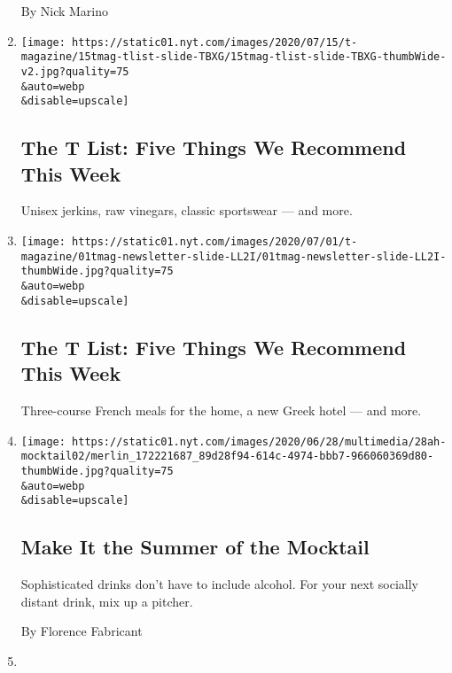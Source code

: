\begin{enumerate}
  By Nick Marino
\item
  \href{/2020/07/16/t-magazine/margo-price-album-tlist.html}{}

  \texttt{[image: https://static01.nyt.com/images/2020/07/15/t-magazine/15tmag-tlist-slide-TBXG/15tmag-tlist-slide-TBXG-thumbWide-v2.jpg?quality=75\\\&auto=webp\\\&disable=upscale]}

  \hypertarget{the-t-list-five-things-we-recommend-this-week-1}{%
  \subsection{The T List: Five Things We Recommend This
  Week}\label{the-t-list-five-things-we-recommend-this-week-1}}

  Unisex jerkins, raw vinegars, classic sportswear --- and more.
\item
  \href{/2020/07/02/t-magazine/kenzo-vans-tlist.html}{}

  \texttt{[image: https://static01.nyt.com/images/2020/07/01/t-magazine/01tmag-newsletter-slide-LL2I/01tmag-newsletter-slide-LL2I-thumbWide.jpg?quality=75\\\&auto=webp\\\&disable=upscale]}

  \hypertarget{the-t-list-five-things-we-recommend-this-week-2}{%
  \subsection{The T List: Five Things We Recommend This
  Week}\label{the-t-list-five-things-we-recommend-this-week-2}}

  Three-course French meals for the home, a new Greek hotel --- and
  more.
\item
  \href{/2020/06/27/at-home/coronavirus-make-mocktails.html}{}

  \texttt{[image: https://static01.nyt.com/images/2020/06/28/multimedia/28ah-mocktail02/merlin\_172221687\_89d28f94-614c-4974-bbb7-966060369d80-thumbWide.jpg?quality=75\\\&auto=webp\\\&disable=upscale]}

  \hypertarget{make-it-the-summer-of-the-mocktail}{%
  \subsection{Make It the Summer of the
  Mocktail}\label{make-it-the-summer-of-the-mocktail}}

  Sophisticated drinks don't have to include alcohol. For your next
  socially distant drink, mix up a pitcher.

  By Florence Fabricant
\item
  \href{/2020/06/24/realestate/grow-garlic-garden-organic.html}{}


\end{enumerate}
